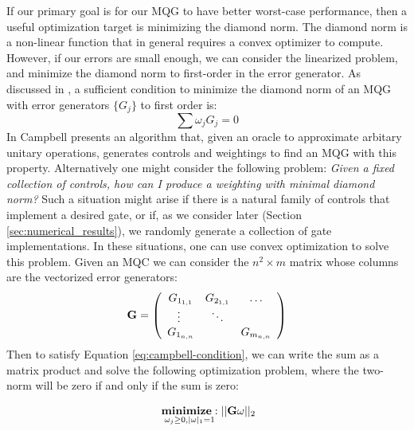 \documentclass[aps,nofootinbib,pra,notitlepage,twocolumn]{revtex4-1}
\begin{document}
If our primary goal is for our MQG to have better worst-case performance, then a useful optimization target is minimizing the diamond norm. The diamond norm is a non-linear function that in general requires a convex optimizer to compute. However, if our errors are small enough, we can consider the linearized problem, and minimize the diamond norm to first-order in the error generator. As discussed in \cite{Campbell2017}, a sufficient condition to minimize the diamond norm of an MQG with error generators $\{G_j\}$ to first order is:
\begin{equation}\label{eq:campbell-condition}
\sum \omega_j G_j = 0
\end{equation}
In \cite{Campbell2017} Campbell presents an algorithm that, given an oracle to approximate arbitary unitary operations, generates controls and weightings to find an MQG with this property. Alternatively one might consider the following problem: \textit{Given a fixed collection of controls, how can I produce a weighting with minimal diamond norm?} Such a situation might arise if there is a natural family of controls that implement a desired gate, or if, as we consider later (Section \ref{sec:numerical_results}), we randomly generate a collection of gate implementations. In these situations, one can use convex optimization to solve this problem. Given an MQC we can consider the $n^2\times m$ matrix whose columns are the vectorized error generators:
\begin{equation}\label{eq:vectorized_generators}
	\bold{G} = \left(\begin{array}{cccc}
		G_{1_{1,1}} & G_{2_{1,1}} & \ldots   \\ 
		\vdots\ & \ddots &    \\
		G_{1_{n,n}} &  &  G_{m_{n,n}} \\ 
	\end{array} 	
	\right)
\end{equation}
Then to satisfy Equation \ref{eq:campbell-condition}, we can write the sum as a matrix product and solve the following optimization problem, where the two-norm will be zero if and only if the sum is zero:

\begin{equation}\label{eq:minimization}
  \begin{split}
    &\underset{\omega_j\geq0, |\omega|_1=1}{\textbf{minimize}: } ||\bold{G}\omega||_2\\
  \end{split}
\end{equation}
\end{document}
